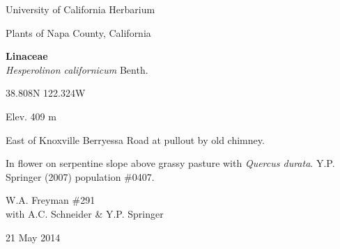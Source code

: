 \documentclass[letterpaper,10pt]{article}
\begin{document}
\begin{minipage}[t]{0.40\textwidth}

\begin{center}
University of California Herbarium \\
\begin{large}
Plants of Napa County, California \\
\end{large}
\vspace{\baselineskip}
\textbf{Linaceae} \\
\textit{Hesperolinon californicum} Benth.\\
\end{center}

\begin{footnotesize}

\begin{multicols}{2}
38.808\textdegree N 122.324\textdegree W
\columnbreak
\begin{flushright}
Elev. 409 m
\end{flushright}
\end{multicols}

East of Knoxville Berryessa Road at pullout by old chimney.
\vspace{\baselineskip}

In flower on serpentine slope above grassy pasture with \textit{Quercus durata}. Y.P. Springer (2007) population \#0407.

\begin{multicols}{2}
W.A. Freyman \#291 \\
with A.C. Schneider \& Y.P. Springer
\columnbreak
\begin{flushright}
21 May 2014
\end{flushright}
\end{multicols}

\end{footnotesize}

\end{minipage}

\vspace{2cm}
%
%

%
%
\end{document}
